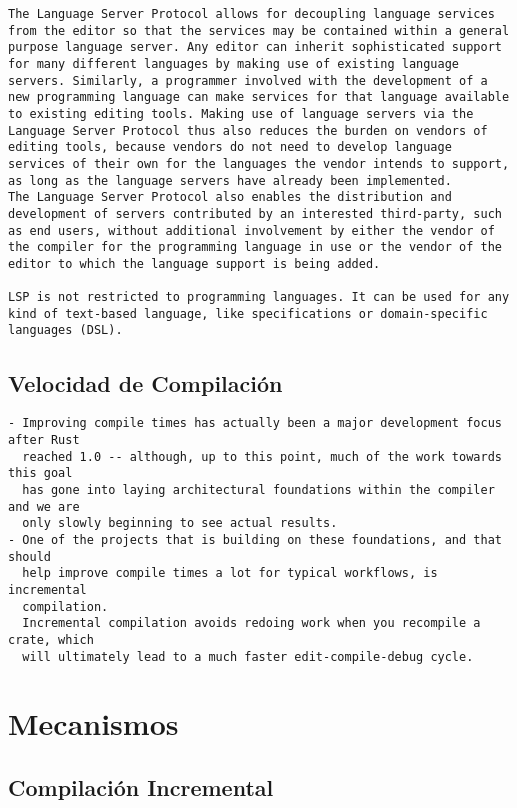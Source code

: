 \documentclass[12pt, a4paper]{report}
\begin{document}
\begin{verbatim}
The Language Server Protocol allows for decoupling language services
from the editor so that the services may be contained within a general
purpose language server. Any editor can inherit sophisticated support
for many different languages by making use of existing language
servers. Similarly, a programmer involved with the development of a
new programming language can make services for that language available
to existing editing tools. Making use of language servers via the
Language Server Protocol thus also reduces the burden on vendors of
editing tools, because vendors do not need to develop language
services of their own for the languages the vendor intends to support,
as long as the language servers have already been implemented.
The Language Server Protocol also enables the distribution and
development of servers contributed by an interested third-party, such
as end users, without additional involvement by either the vendor of
the compiler for the programming language in use or the vendor of the
editor to which the language support is being added.

LSP is not restricted to programming languages. It can be used for any
kind of text-based language, like specifications or domain-specific
languages (DSL).
\end{verbatim}

\subsection*{Velocidad de Compilación}

\begin{verbatim}
- Improving compile times has actually been a major development focus after Rust
  reached 1.0 -- although, up to this point, much of the work towards this goal
  has gone into laying architectural foundations within the compiler and we are
  only slowly beginning to see actual results.
- One of the projects that is building on these foundations, and that should
  help improve compile times a lot for typical workflows, is incremental
  compilation.
  Incremental compilation avoids redoing work when you recompile a crate, which
  will ultimately lead to a much faster edit-compile-debug cycle.
\end{verbatim}

\section*{Mecanismos}

\subsection*{Compilación Incremental}
\end{document}
